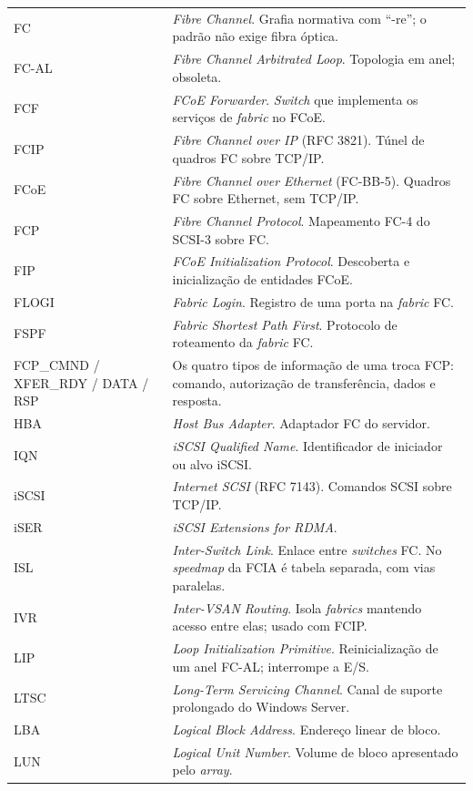 \documentclass[11pt,a4paper]{article}
\begin{document}
{\begin{longtable}{@{}p{2.2cm}p{13.4cm}@{}}
FC & \textit{Fibre Channel}. Grafia normativa com ``-re''; o padrão não exige fibra óptica. \\
FC-AL & \textit{Fibre Channel Arbitrated Loop}. Topologia em anel; obsoleta. \\
FCF & \textit{FCoE Forwarder}. \textit{Switch} que implementa os serviços de \textit{fabric} no FCoE. \\
FCIP & \textit{Fibre Channel over IP} (RFC 3821). Túnel de quadros FC sobre TCP/IP. \\
FCoE & \textit{Fibre Channel over Ethernet} (FC-BB-5). Quadros FC sobre Ethernet, sem TCP/IP. \\
FCP & \textit{Fibre Channel Protocol}. Mapeamento FC-4 do SCSI-3 sobre FC. \\
FIP & \textit{FCoE Initialization Protocol}. Descoberta e inicialização de entidades FCoE. \\
FLOGI & \textit{Fabric Login}. Registro de uma porta na \textit{fabric} FC. \\
FSPF & \textit{Fabric Shortest Path First}. Protocolo de roteamento da \textit{fabric} FC. \\
FCP\_CMND / XFER\_RDY / DATA / RSP & Os quatro tipos de informação de uma troca FCP: comando,
autorização de transferência, dados e resposta. \\
HBA & \textit{Host Bus Adapter}. Adaptador FC do servidor. \\
IQN & \textit{iSCSI Qualified Name}. Identificador de iniciador ou alvo iSCSI. \\
iSCSI & \textit{Internet SCSI} (RFC 7143). Comandos SCSI sobre TCP/IP. \\
iSER & \textit{iSCSI Extensions for RDMA}. \\
ISL & \textit{Inter-Switch Link}. Enlace entre \textit{switches} FC. No \textit{speedmap} da FCIA é
tabela separada, com vias paralelas. \\
IVR & \textit{Inter-VSAN Routing}. Isola \textit{fabrics} mantendo acesso entre elas; usado com FCIP. \\
LIP & \textit{Loop Initialization Primitive}. Reinicialização de um anel FC-AL; interrompe a E/S. \\
LTSC & \textit{Long-Term Servicing Channel}. Canal de suporte prolongado do Windows Server. \\
LBA & \textit{Logical Block Address}. Endereço linear de bloco. \\
LUN & \textit{Logical Unit Number}. Volume de bloco apresentado pelo \textit{array}. \\

\end{longtable}}
\end{document}
